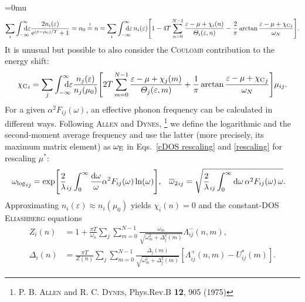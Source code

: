 \documentclass[a4paper]{article}
\def\D{\mathrm d}
\def\E{\mathrm e}
\def\sub#1{\sb{\mathrm{#1}}}
\def\from#1{\sb{\mathrlap{#1}}}
\def\till#1{\sp{\mathrlap{#1}}}
\let\Delta\varDelta
\let\epsilon\varepsilon
\let\Lambda\varLambda
\let\Theta\varTheta
\begin{document}
   \begingroup
   \medmuskip=0mu
   \begin{equation*}
      \sum_i \int \from{-\infty} \till \infty \D \epsilon
      \frac{2 n_i(\epsilon)}{\E^{(\epsilon - \mu_0) / T} + 1}
      = n_0 \overset ! = n
      = \sum_i \int \from{-\infty} \till \infty \D \epsilon \,
      n_i(\epsilon)
      \Biggl[
          1 - 4 T \sum_{n = 0}^{N - 1}
         \frac{\epsilon - \mu + \chi_i(n)}{\Theta_i(\epsilon, n)}
         - \frac 2 \pi \arctan \frac{\epsilon - \mu + {\chi \sub C}_i}{\omega_N}
      \Biggr].
   \end{equation*}
   \endgroup
   It is unusual but possible to also consider the \textsc{Coulomb} contribution
   to the energy shift:
   \begin{equation*}
      {\chi \sub C}_i = \sum_j
      \int \from{-\infty} \till \infty \D \epsilon
      \frac{n_j(\epsilon)}{n_j(\mu_0)}
      \Biggl[
         2 T \sum_{m = 0}^{N - 1}
         \frac{\epsilon - \mu + \chi_j(m)}{\Theta_j(\epsilon, m)}
         + \frac 1 \pi \arctan \frac{\epsilon - \mu + {\chi \sub C}_j}{\omega_N}
      \Biggr]
      \mu_{i j}.
   \end{equation*}
   For a given $\alpha^2 F_{i j}(\omega)$, an effective phonon frequency can be
   calculated in different ways. Following \textsc{Allen} and \textsc{Dynes},%
   \footnote{%
      P. B. \textsc{Allen} and R. C. \textsc{Dynes}, Phys.\@ Rev.\@ B
      \textbf{12}, 905 (1975)
      }
   we define the logarithmic and the second-moment average frequency and use
   the latter (more precisely, its maximum matrix element) as $\omega \sub E$
   in Eqs.~\ref{cDOS rescaling} and \ref{rescaling} for rescaling $\mu^*$:
   \begin{align*}
       {\omega \sub{log}}_{i j} &= \exp
       \Biggl[
          \frac 2 \lambda_{i j} \int_0^\infty
          \frac{\D \omega} \omega
          \alpha^2 F_{i j}(\omega) \ln(\omega)
       \Biggr],
       &
       {\overline \omega_2}_{i j} &= \sqrt
       {
          \frac 2 \lambda_{i j} \int_0^\infty
          \D \omega \,
          \alpha^2 F_{i j}(\omega) \, \omega
       }.
   \end{align*}
   Approximating $n_i(\epsilon) \approx n_i(\mu_0)$ yields $\chi_i(n) = 0$ and
   the constant-DOS \textsc{Eliashberg} equations
   \begin{equation}
      \begin{split}
         Z_i(n) &= 1 + \frac{\pi T}{\omega_n} \sum_j \sum_{m = 0}^{N - 1}
         \frac{\omega_m}{\sqrt{\omega_m^2 + \Delta_j^2(m)}}
         \Lambda_{i j}^-(n, m),
         \\
         \Delta_i(n) &= \frac{\pi T}{Z(n)} \sum_j \sum_{m = 0}^{N - 1}
         \frac{\Delta_j(m)}{\sqrt{\omega_m^2 + \Delta_j^2(m)}}
         [\Lambda_{i j}^+(n, m) - U^*_{i j}(m)].
      \end{split}
      \label{cDOS Eliashberg equations}
   \end{equation}
\end{document}
